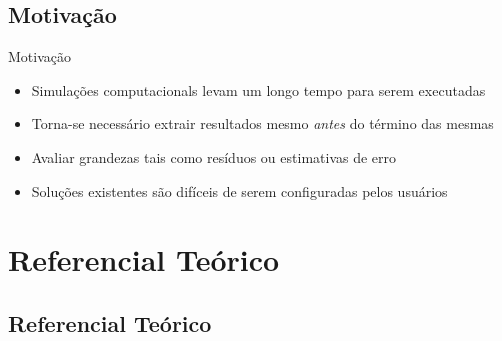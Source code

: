 \documentclass[12pt,compress,final]{beamer}
\begin{document}

\subsection*{Motivação}

\begin{frame}{Motivação}

\begin{itemize}
    \item Simulações computacionals levam um longo tempo para serem executadas %
    \item Torna-se necessário extrair resultados mesmo \emph{antes} do término das mesmas
    \pause
    \item Avaliar grandezas tais como resíduos ou estimativas de erro
    \item Soluções existentes são difíceis de serem configuradas pelos usuários
\end{itemize}

\end{frame}


\section{Referencial Teórico}
\subsection*{Referencial Teórico}
\end{document}
